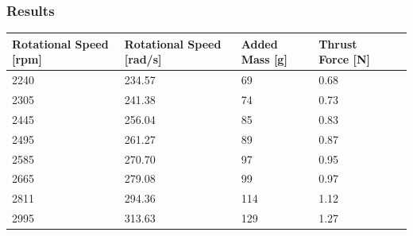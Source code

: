 \subsubsection{Results}
\begin{table}[H]
	\centering
	\begin{tabular}{|l|l|l|l|p{4.3cm}|}
		\hline%
		\textbf{Rotational Speed [rpm]}    & \textbf{Rotational Speed [rad/s]} & \textbf{Added Mass [g]}  & \textbf{Thrust Force [N]} \\ 
		\hline%
		2240                        	   &  234.57                           & 69                       & 0.68         \\
		\hline%
		2305 						       &  241.38				           & 74                       & 0.73         \\
		\hline%
		2445                               &  256.04   			               & 85                       & 0.83         \\
		\hline%
		2495                               &  261.27			               & 89                       & 0.87         \\
		\hline%
		2585                               &  270.70                          & 97                       & 0.95         \\
		\hline%
		2665 						       &  279.08			           & 99                       & 0.97         \\
		\hline%
		2811                               &  294.36   			           & 114                      & 1.12         \\
		\hline%
		2995                               &  313.63                          & 129                      & 1.27         \\

\end{tabular}
\end{table}
